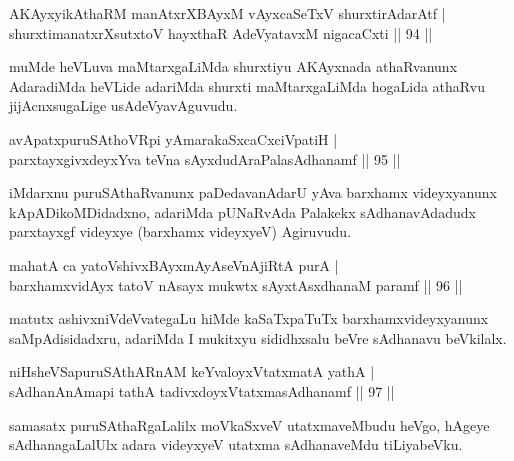 
\begin{shl}
AKAyxyikAthaRM manAtxrXBAyxM vAyxcaSeTxV shurxtirAdarAtf |\\
shurxtimanatxrXsutxtoV hayxthaR AdeVyatavxM nigacaCxti \hfill || 94 ||
\end{shl}

\begin{artha}
muMde heVLuva maMtarxgaLiMda shurxtiyu AKAyxnada athaRvanunx AdaradiMda heVLide adariMda shurxti maMtarxgaLiMda hogaLida athaRvu jijAcnxsugaLige usAdeVyavAguvudu.
\end{artha}


\begin{shl}
avApatxpuruSAthoVR\s pi yAmarakaSxcaCxciVpatiH |\\
parxtayxgivxdeyxYva teVna sAyxdudAraPalasAdhanamf \hfill || 95 ||
\end{shl}

\begin{artha}
iMdarxnu puruSAthaRvanunx paDedavanAdarU yAva barxhamx videyxyanunx kApADikoMDidadxno, adariMda pUNaRvAda Palakekx sAdhanavAdadudx parxtayxgf videyxye (barxhamx videyxyeV) Agiruvudu.
\end{artha}

\begin{shl}
mahatA ca yatoV\s shivxBAyxmAyAseVnAjiRtA purA |\\
barxhamxvidAyx tatoV nAsayx mukwtx sAyxtAsxdhanaM paramf \hfill || 96 ||
\end{shl}

\begin{artha}
matutx ashivxniVdeVvategaLu hiMde kaSaTxpaTuTx barxhamxvideyxyanunx saMpAdisidadxru, adariMda I mukitxyu sididhxsalu beVre sAdhanavu beVkilalx.
\end{artha}

\begin{shl}
niHsheVSapuruSAthARnAM keYvaloyxVtatxmatA yathA |\\
sAdhanAnAmapi tathA tadivxdoyxVtatxmasAdhanamf \hfill || 97 ||
\end{shl}

\begin{artha}
samasatx puruSAthaRgaLalilx moVkaSxveV utatxmaveMbudu heVgo, hAgeye sAdhanagaLalUlx adara videyxyeV utatxma sAdhanaveMdu tiLiyabeVku.
\end{artha}

